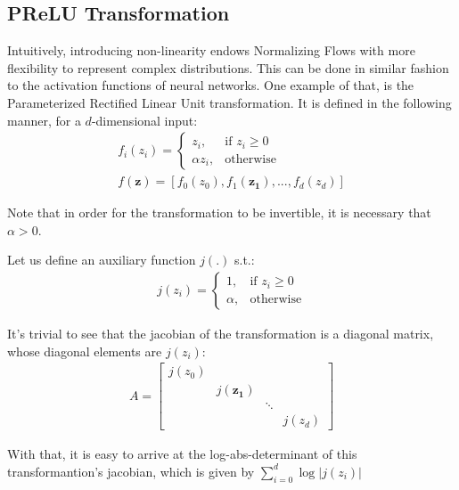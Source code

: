 \subsection{PReLU Transformation}
Intuitively, introducing non-linearity endows Normalizing Flows with more flexibility to 
represent complex distributions. This can be done in similar fashion to the
activation functions of neural networks. One example of that, is the Parameterized
Rectified Linear Unit transformation. It is defined in the following manner, for
a $d$-dimensional input:
\begin{align}
f_i(z_i) =
    \begin{cases}
        z_i,              & \text{if } z_i\geq 0\\
        \alpha z_i,       & \text{otherwise}
    \end{cases} \\
f(\bm{z}) = [f_0(z_0), f_1(\bm{z_1}), ..., f_d(z_d)]
\end{align}

Note that in order for the transformation to be invertible, it is necessary
that $\alpha > 0$.

Let us define an auxiliary function $j(.)$ s.t.:
\begin{align}
j(z_i) =
    \begin{cases}
       1 ,              & \text{if } z_i \geq 0\\
       \alpha ,       & \text{otherwise}
    \end{cases}
\end{align}

It's trivial to see that the jacobian of the transformation is a diagonal
matrix, whose diagonal elements are $j(z_i)$:
\begin{align}
  A =
  \begin{bmatrix}
      j(z_0) & & & \\
      & j(\bm{z_1}) & & \\
      & & \ddots & \\
      & & & j(z_d)
  \end{bmatrix}
\end{align}

With that, it is easy to arrive at the log-abs-determinant of this transformantion's
jacobian, which is given by $\sum_{i=0}^d \log \Big| j(z_i) \Big|$


